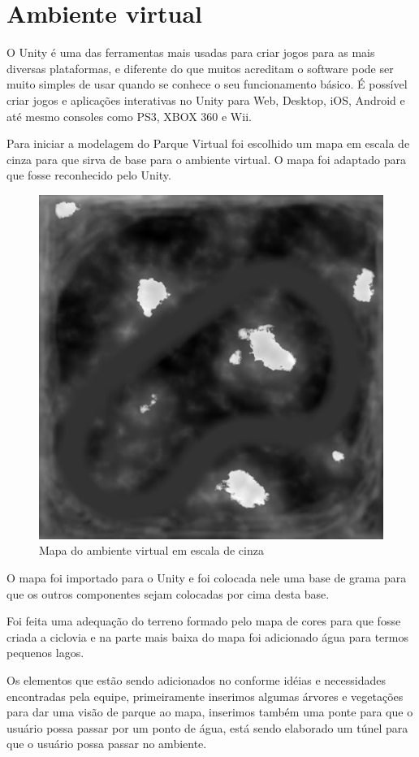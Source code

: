 \section{Ambiente virtual}





O Unity é uma das ferramentas mais usadas para criar jogos para as mais diversas 
plataformas, e diferente do que muitos acreditam o software pode ser muito simples 
de usar quando se conhece o seu funcionamento básico. É possível criar jogos e 
aplicações interativas no Unity para Web, Desktop, iOS, Android e até mesmo 
consoles como PS3, XBOX 360 e Wii.

Para iniciar a modelagem do Parque Virtual foi escolhido um mapa em escala de 
cinza para que sirva de base para o ambiente virtual. O mapa foi adaptado para 
que fosse reconhecido pelo Unity.

\begin{figure}[htpb]
 \begin{center}
    \includegraphics[width=.40\textwidth]{figuras/mapa.jpg}
 \end{center}
  \caption{Mapa do ambiente virtual em escala de cinza}
  \label{fig:core_concurrent}
\end{figure}

O mapa foi importado para o Unity e foi colocada nele uma base de grama para que
os outros componentes sejam colocadas por cima desta base.

Foi feita uma adequação do terreno formado pelo mapa de cores para que fosse criada
a ciclovia e na parte mais baixa do mapa foi adicionado água para termos pequenos 
lagos.

Os elementos que estão sendo adicionados no conforme idéias e necessidades encontradas
pela equipe, primeiramente inserimos algumas árvores e vegetações para dar uma visão
de parque ao mapa, inserimos também uma ponte para que o usuário possa passar por um 
ponto de água, está sendo elaborado um túnel para que o usuário possa passar no 
ambiente.  


